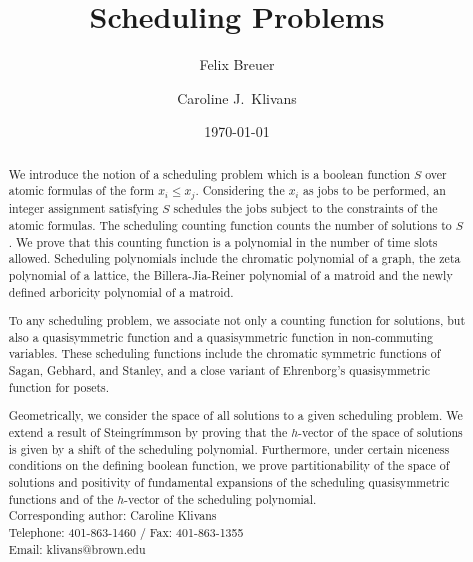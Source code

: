\documentclass[12pt,reqno]{amsart}
\numberwithin{definition}{section}
\theoremstyle{definition}
\begin{document}
\title{Scheduling Problems}
\author{Felix Breuer}
\address{Research Institute for Symbolic Computation \\ Johannes Kepler University Linz}
\author{Caroline J.\ Klivans}
\address{Departments of Applied Mathematics and Computer Science \\Brown University}
\date{\today}


\begin{abstract} We introduce the notion of a scheduling problem which is a boolean function $S$ over atomic formulas of the form $x_i \leq x_j$.  Considering the $x_i$ as jobs to be performed, an integer assignment satisfying $S$ schedules the jobs subject to the constraints of the atomic formulas.  The scheduling counting function counts the number of solutions to $S$. We prove that this counting function is a polynomial in the number of time slots allowed. 
 Scheduling polynomials include the chromatic polynomial of a graph, the zeta polynomial of a lattice, the Billera-Jia-Reiner polynomial of a matroid and the newly defined arboricity polynomial of a matroid. 

To any scheduling problem, we associate not only a counting function for solutions, but also a quasisymmetric function and a quasisymmetric function in non-commuting variables. These scheduling functions include the chromatic symmetric functions of Sagan, Gebhard, and Stanley, and a close variant of  Ehrenborg's quasisymmetric function for posets.  

Geometrically, we consider the space of all solutions to a given scheduling problem.
We extend a result of Steingr\'{i}mmson by proving that the $h$-vector of the space of solutions is given by a shift of the scheduling polynomial.  Furthermore, under certain niceness conditions on the defining boolean function, we prove partitionability of the space of solutions and positivity of fundamental expansions of the scheduling quasisymmetric functions and of the $h$-vector of the scheduling polynomial.  \\



\noindent Corresponding author: Caroline Klivans\\
Telephone: 401-863-1460 / Fax: 401-863-1355\\
Email: klivans@brown.edu\\


\end{abstract}
\maketitle
\end{document}
